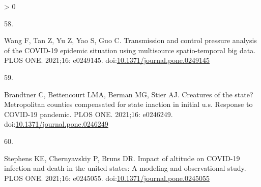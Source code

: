 \documentclass[10pt,letterpaper]{article}
\newlength{\csllabelwidth}
\newlength{\cslhangindent}
\newenvironment{CSLReferences}[3] %
 {%
  \setlength{\parindent}{0pt}
  \ifodd #1 \everypar{\setlength{\hangindent}{\cslhangindent}}\ignorespaces\fi
  \ifnum #2 > 0
  \setlength{\parskip}{#2\baselineskip}
  \fi
 }%
 {}
\newcommand{\CSLLeftMargin}[1]{\parbox[t]{\csllabelwidth}{#1}}
\newcommand{\CSLRightInline}[1]{\parbox[t]{\linewidth - \csllabelwidth}{#1}}
\begin{document}
\begin{CSLReferences}{0}{0}
\leavevmode\hypertarget{ref-Wang2021transmission}{}%
\CSLLeftMargin{58. }
\CSLRightInline{Wang F, Tan Z, Yu Z, Yao S, Guo C. Transmission and
control pressure analysis of the COVID-19 epidemic situation using
multisource spatio-temporal big data. PLOS ONE. 2021;16: e0249145.
doi:\href{https://doi.org/10.1371/journal.pone.0249145}{10.1371/journal.pone.0249145}}

\leavevmode\hypertarget{ref-Brandtner2021creatures}{}%
\CSLLeftMargin{59. }
\CSLRightInline{Brandtner C, Bettencourt LMA, Berman MG, Stier AJ.
Creatures of the state? Metropolitan counties compensated for state
inaction in initial u.s. Response to COVID-19 pandemic. PLOS ONE.
2021;16: e0246249.
doi:\href{https://doi.org/10.1371/journal.pone.0246249}{10.1371/journal.pone.0246249}}

\leavevmode\hypertarget{ref-Stephens2021impact}{}%
\CSLLeftMargin{60. }
\CSLRightInline{Stephens KE, Chernyavskiy P, Bruns DR. Impact of
altitude on COVID-19 infection and death in the united states: A
modeling and observational study. PLOS ONE. 2021;16: e0245055.
doi:\href{https://doi.org/10.1371/journal.pone.0245055}{10.1371/journal.pone.0245055}}

\end{CSLReferences}

\nolinenumbers
\end{document}
